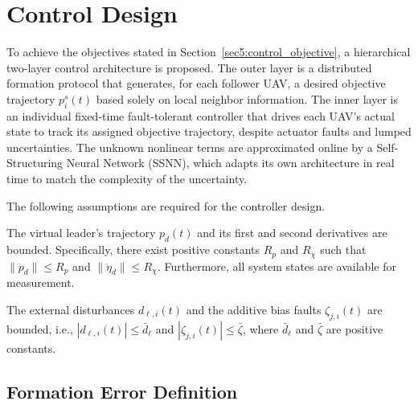 \section{Control Design}
\label{sec5:control_design}

To achieve the objectives stated in Section~\ref{sec5:control_objective}, a
hierarchical two-layer control architecture is proposed. The outer layer is a
distributed formation protocol that generates, for each follower UAV, a desired
objective trajectory $p_i^s(t)$ based solely on local neighbor information. The
inner layer is an individual fixed-time fault-tolerant controller that drives each
UAV's actual state to track its assigned objective trajectory, despite actuator
faults and lumped uncertainties. The unknown nonlinear terms are approximated
online by a Self-Structuring Neural Network (SSNN), which adapts its own
architecture in real time to match the complexity of the uncertainty.

The following assumptions are required for the controller design.

\begin{assumption}
\label{assum:leader}
The virtual leader's trajectory $p_d(t)$ and its first and second derivatives are
bounded. Specifically, there exist positive constants $R_p$ and $R_\chi$ such that
$\|\ddot{p}_d\| \leq R_p$ and $\|\ddot{\eta}_d\| \leq R_\chi$. Furthermore, all
system states are available for measurement.
\end{assumption}

\begin{assumption}
\label{assum:disturbance}
The external disturbances $d_{\ell,i}(t)$ and the additive bias faults
$\zeta_{j,i}(t)$ are bounded, i.e., $|d_{\ell,i}(t)| \leq \bar{d}_\ell$ and
$|\zeta_{j,i}(t)| \leq \bar{\zeta}$, where $\bar{d}_\ell$ and $\bar{\zeta}$ are
positive constants.
\end{assumption}

\subsection{Formation Error Definition}
\label{sec5:formation_error}

